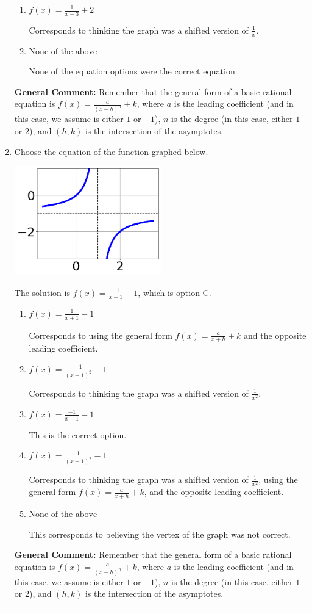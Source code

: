 \documentclass{extbook}[14pt]
\newcommand{\litem}[1]{\item #1

\rule{\textwidth}{0.4pt}}
\begin{document}
\begin{enumerate}
{\begin{enumerate}[label=\Alph*.]
The $x$-value of the equation does not match the graph.
\item \( f(x) = \frac{1}{x - 3} + 2 \)

Corresponds to thinking the graph was a shifted version of $\frac{1}{x}$.
\item \( \text{None of the above} \)

None of the equation options were the correct equation.
\end{enumerate}

\textbf{General Comment:} Remember that the general form of a basic rational equation is $ f(x) = \frac{a}{(x-h)^n} + k$, where $a$ is the leading coefficient (and in this case, we assume is either $1$ or $-1$), $n$ is the degree (in this case, either $1$ or $2$), and $(h, k)$ is the intersection of the asymptotes.
}
\litem{
Choose the equation of the function graphed below.

\begin{center}
    \includegraphics[width=0.5\textwidth]{../Figures/rationalGraphToEquationCopyA.png}
\end{center}


The solution is \( f(x) = \frac{-1}{x - 1} - 1 \), which is option C.\begin{enumerate}[label=\Alph*.]
\item \( f(x) = \frac{1}{x + 1} - 1 \)

Corresponds to using the general form $f(x) = \frac{a}{x+h}+k$ and the opposite leading coefficient.
\item \( f(x) = \frac{-1}{(x - 1)^2} - 1 \)

Corresponds to thinking the graph was a shifted version of $\frac{1}{x^2}$.
\item \( f(x) = \frac{-1}{x - 1} - 1 \)

This is the correct option.
\item \( f(x) = \frac{1}{(x + 1)^2} - 1 \)

Corresponds to thinking the graph was a shifted version of $\frac{1}{x^2}$, using the general form $f(x) = \frac{a}{x+h}+k$, and the opposite leading coefficient.
\item \( \text{None of the above} \)

This corresponds to believing the vertex of the graph was not correct.
\end{enumerate}

\textbf{General Comment:} Remember that the general form of a basic rational equation is $ f(x) = \frac{a}{(x-h)^n} + k$, where $a$ is the leading coefficient (and in this case, we assume is either $1$ or $-1$), $n$ is the degree (in this case, either $1$ or $2$), and $(h, k)$ is the intersection of the asymptotes.
}
\end{enumerate}
\end{document}
